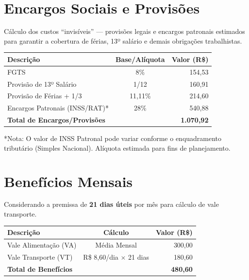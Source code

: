 \documentclass[12pt, a4paper]{article}
\begin{document}
\section{Encargos Sociais e Provisões}

Cálculo dos custos ``invisíveis'' --- provisões legais e encargos patronais estimados para garantir a cobertura de férias, 13º salário e demais obrigações trabalhistas.

\begin{table}[H]
    \centering
    \renewcommand{\arraystretch}{1.5}
    \begin{tabularx}{\textwidth}{X c r}
        \toprule
        \rowcolor{tableHeader} \textbf{Descrição} & \textbf{Base/Alíquota} & \textbf{Valor (R\$)} \\
        \midrule
        FGTS & 8\% & 154,53 \\
        \rowcolor{lightGray}
        Provisão de 13º Salário & 1/12 & 160,91 \\
        Provisão de Férias + 1/3 & 11,11\% & 214,60 \\
        \rowcolor{lightGray}
        Encargos Patronais (INSS/RAT)* & 28\% & 540,88 \\
        \midrule
        \rowcolor{accentColor!10} \textbf{Total de Encargos/Provisões} & & \textbf{1.070,92} \\
        \bottomrule
    \end{tabularx}
\end{table}

\textcolor{secondaryText}{\footnotesize{*Nota: O valor de INSS Patronal pode variar conforme o enquadramento tributário (Simples Nacional). Alíquota estimada para fins de planejamento.}}

\section{Benefícios Mensais}

Considerando a premissa de \textbf{21 dias úteis} por mês para cálculo de vale transporte.

\begin{table}[H]
    \centering
    \renewcommand{\arraystretch}{1.5}
    \begin{tabularx}{\textwidth}{X c r}
        \toprule
        \rowcolor{tableHeader} \textbf{Descrição} & \textbf{Cálculo} & \textbf{Valor (R\$)} \\
        \midrule
        Vale Alimentação (VA) & Média Mensal & 300,00 \\
        \rowcolor{lightGray}
        Vale Transporte (VT) & R\$ 8,60/dia $\times$ 21 dias & 180,60 \\
        \midrule
        \rowcolor{accentColor!10} \textbf{Total de Benefícios} & & \textbf{480,60} \\
        \bottomrule
    \end{tabularx}
\end{table}
\end{document}
